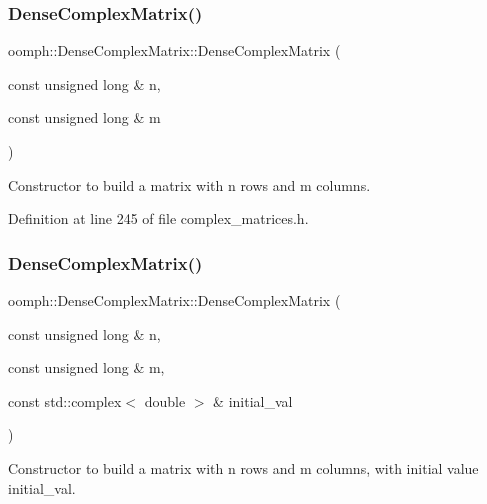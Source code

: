 \subsubsection{\texorpdfstring{Dense\+Complex\+Matrix()}{DenseComplexMatrix()}\hspace{0.1cm}{\footnotesize\ttfamily [3/6]}}
{\footnotesize\ttfamily oomph\+::\+Dense\+Complex\+Matrix\+::\+Dense\+Complex\+Matrix (\begin{DoxyParamCaption}\item[{const unsigned long \&}]{n,  }\item[{const unsigned long \&}]{m }\end{DoxyParamCaption})\hspace{0.3cm}{\ttfamily [inline]}}



Constructor to build a matrix with n rows and m columns. 



Definition at line 245 of file complex\+\_\+matrices.\+h.

\mbox{\label{classoomph_1_1DenseComplexMatrix_a88144ac8dc64438f77b2aec56b283e87}} 
\subsubsection{\texorpdfstring{Dense\+Complex\+Matrix()}{DenseComplexMatrix()}\hspace{0.1cm}{\footnotesize\ttfamily [4/6]}}
{\footnotesize\ttfamily oomph\+::\+Dense\+Complex\+Matrix\+::\+Dense\+Complex\+Matrix (\begin{DoxyParamCaption}\item[{const unsigned long \&}]{n,  }\item[{const unsigned long \&}]{m,  }\item[{const std\+::complex$<$ double $>$ \&}]{initial\+\_\+val }\end{DoxyParamCaption})\hspace{0.3cm}{\ttfamily [inline]}}



Constructor to build a matrix with n rows and m columns, with initial value initial\+\_\+val. 



